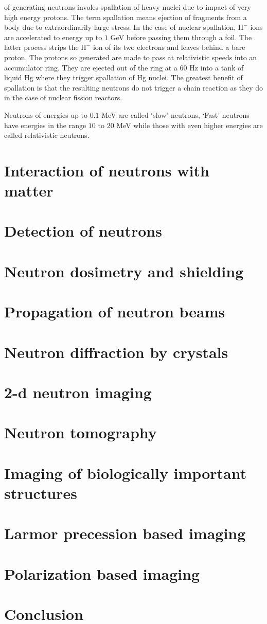\documentclass{article}
\numberwithin{equation}{section}
\begin{document}
of generating neutrons involes spallation of heavy nuclei due to impact of 
very high energy protons. The term spallation means ejection of fragments from
a body due to extraordinarily large stress. In the case of nuclear spallation,
$\text{H}^{-}$ ions are accelerated to energy up to $1$ GeV before passing
them through a foil. The latter process strips the $\text{H}^{-}$ ion of its
two electrons and leaves behind a bare proton. The protons so generated are
made to pass at relativistic speeds into an accumulator ring. They are 
ejected out of the ring at a $60$ Hz into a tank of liquid Hg where they
trigger spallation of Hg nuclei. The greatest benefit of spallation is that
the resulting neutrons do not trigger a chain reaction as they do in the case
of nuclear fission reactors.

Neutrons of energies up to $0.1$ MeV are called `slow' neutrons, `Fast'
neutrons have energies in the range $10$ to $20$ MeV while those with even
higher energies are called relativistic neutrons.

\section{Interaction of neutrons with matter}\label{s4}
\section{Detection of neutrons}\label{s5}
\section{Neutron dosimetry and shielding}\label{s6}
\section{Propagation of neutron beams}\label{s7}
\section{Neutron diffraction by crystals}\label{s8}
\section{2-d neutron imaging}\label{s9}
\section{Neutron tomography}\label{s10}
\section{Imaging of biologically important structures}\label{s11}
\section{Larmor precession based imaging}\label{s12}
\section{Polarization based imaging}\label{s13}
\section{Conclusion}\label{s14}


\end{document}
